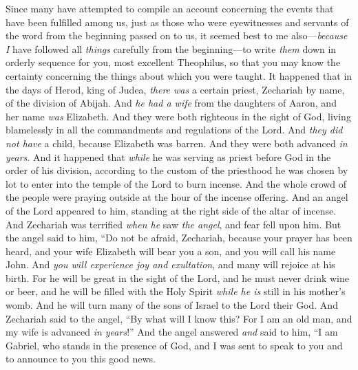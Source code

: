 
\begin{biblechapter} %
 Since many have attempted to compile an account concerning the events that have been fulfilled among us,
\verse just as those who were eyewitnesses and servants of the word from the beginning passed on to us,
\verse it seemed best to me also—\textit{because I} have followed all \textit{things} carefully from the beginning—to write \textit{them} down in orderly sequence for you, most excellent Theophilus,
\verse so that you may know the certainty concerning the things about which you were taught.
 It happened that in the days of Herod, king of Judea, \textit{there was} a certain priest, Zechariah by name, of the division of Abijah. And \textit{he had a wife} from the daughters of Aaron, and her name \textit{was} Elizabeth.
\verse And they were both righteous in the sight of God, living blamelessly in all the commandments and regulations of the Lord.
\verse And \textit{they did not have} a child, because Elizabeth was barren. And they were both advanced \textit{in years}.
\verse And it happened that \textit{while} he was serving as priest before God in the order of his division,
\verse according to the custom of the priesthood he was chosen by lot to enter into the temple of the Lord to burn incense.
\verse And the whole crowd of the people were praying outside at the hour of the incense offering.
\verse And an angel of the Lord appeared to him, standing at the right side of the altar of incense.
\verse And Zechariah was terrified \textit{when he} saw \textit{the angel}, and fear fell upon him.
\verse But the angel said to him,
\verse “Do not be afraid, Zechariah, 
because your prayer has been heard, 
and your wife Elizabeth will bear you a son, 
and you will call his name John.
\verse And \textit{you will experience joy and exultation}, 
and many will rejoice at his birth.
\verse For he will be great in the sight of the Lord, 
and he must never drink wine or beer, 
and he will be filled with the Holy Spirit 
\textit{while he is} still in his mother’s womb.
\verse And he will turn many of the sons of Israel 
to the Lord their God.
\verse And Zechariah said to the angel, “By what will I know this? For I am an old man, and my wife is advanced \textit{in years}!”
\verse And the angel answered \textit{and} said to him, “I am Gabriel, who stands in the presence of God, and I was sent to speak to you and to announce to you this good news.

\end{biblechapter}
